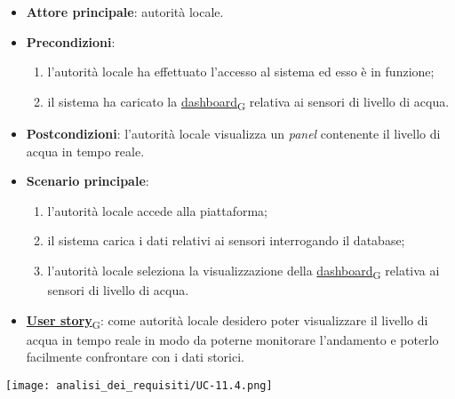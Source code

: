 \begin{itemize}
	\item \textbf{Attore principale}: autorità locale.
	\item \textbf{Precondizioni}:
	      \begin{enumerate}
		      \item l'autorità locale ha effettuato l'accesso al sistema ed esso è in funzione;
		      \item il sistema ha caricato la \href{https://7last.github.io/docs/rtb/documentazione-interna/glossario\#dashboard}{dashboard\textsubscript{G}} relativa ai sensori di livello di acqua.
	      \end{enumerate}
	\item \textbf{Postcondizioni}: l'autorità locale visualizza un \textit{panel} contenente il livello di acqua in tempo reale.
	\item \textbf{Scenario principale}:
	      \begin{enumerate}
		      \item l'autorità locale accede alla piattaforma;
		      \item il sistema carica i dati relativi ai sensori interrogando il database;
		      \item l'autorità locale seleziona la visualizzazione della \href{https://7last.github.io/docs/rtb/documentazione-interna/glossario\#dashboard}{dashboard\textsubscript{G}} relativa ai sensori di livello di acqua.
	      \end{enumerate}
	\item \href{https://7last.github.io/docs/rtb/documentazione-interna/glossario\#user-story}{\textbf{User story}\textsubscript{G}}:
	      come autorità locale desidero poter visualizzare il livello di acqua in tempo reale in modo da poterne monitorare l'andamento
	      e poterlo facilmente confrontare con i dati storici.
\end{itemize}
\begin{center}
	\texttt{[image: analisi\_dei\_requisiti/UC-11.4.png]}
\end{center}

